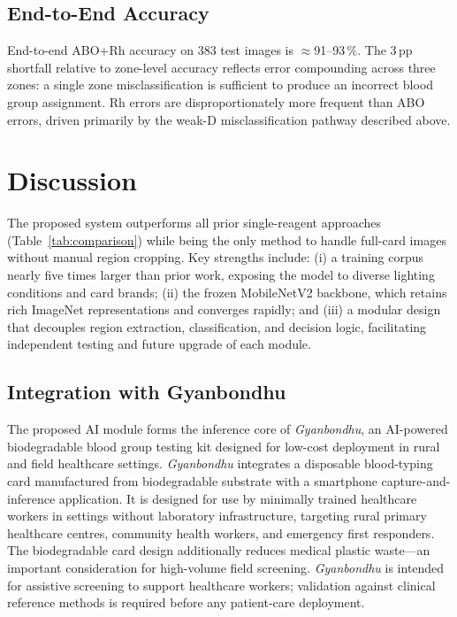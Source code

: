 \documentclass[conference]{IEEEtran}
\begin{document}
\subsection{End-to-End Accuracy}

End-to-end ABO+Rh accuracy on 383 test images is $\approx$91--93\,\%.
The 3\,pp shortfall relative to zone-level accuracy reflects error
compounding across three zones: a single zone misclassification is
sufficient to produce an incorrect blood group assignment.
Rh errors are disproportionately more frequent than ABO errors,
driven primarily by the weak-D misclassification pathway described
above.

\section{Discussion}

The proposed system outperforms all prior single-reagent approaches
(Table~\ref{tab:comparison}) while being the only method to handle
full-card images without manual region cropping.
Key strengths include: (i) a training corpus nearly five times
larger than prior work, exposing the model to diverse lighting
conditions and card brands; (ii) the frozen MobileNetV2 backbone,
which retains rich ImageNet representations and converges rapidly;
and (iii) a modular design that decouples region extraction,
classification, and decision logic, facilitating independent testing
and future upgrade of each module.

\subsection{Integration with Gyanbondhu}

The proposed AI module forms the inference core of
\emph{Gyanbondhu}, an AI-powered biodegradable blood group testing
kit designed for low-cost deployment in rural and field healthcare
settings.
\emph{Gyanbondhu} integrates a disposable blood-typing card
manufactured from biodegradable substrate with a smartphone
capture-and-inference application.
It is designed for use by minimally trained healthcare workers in
settings without laboratory infrastructure, targeting rural primary
healthcare centres, community health workers, and emergency first
responders.
The biodegradable card design additionally reduces medical plastic
waste---an important consideration for high-volume field screening.
\emph{Gyanbondhu} is intended for assistive screening to support
healthcare workers; validation against clinical reference methods
is required before any patient-care deployment.
\end{document}
